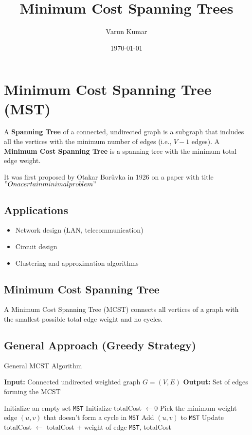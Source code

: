 \documentclass[a4paper,14pt]{extarticle}
\title{Minimum Cost Spanning Trees}
\author{Varun Kumar}
\date{\today}
\begin{document}
\maketitle
\tableofcontents
\lstlistoflistings
\listofalgorithms
\listoftables
\newpage
\section{Minimum Cost Spanning Tree (MST)}

A \textbf{Spanning Tree} of a connected, undirected graph is a subgraph that includes 
all the vertices with the minimum number of edges (i.e., $V-1$ edges). 
A \textbf{Minimum Cost Spanning Tree} is a spanning tree with the minimum total edge weight.

It was first proposed by Otakar Borůvka\cite{boruvka1926} in 1926 on a paper with title $"On a certain minimal problem"$


\subsection*{Applications}
\begin{itemize}
    \item Network design (LAN, telecommunication)\cite{gallager1983}
    \item Circuit design
    \item Clustering and approximation algorithms
\end{itemize}

\subsection{Minimum Cost Spanning Tree}

A Minimum Cost Spanning Tree (MCST) connects all vertices of a graph with the smallest possible total edge weight and no cycles.

\subsection{General Approach (Greedy Strategy)}

\begin{algorithm}[H]
\caption{General MCST Algorithm}
\begin{algorithmic}[1]
\State \textbf{Input:} Connected undirected weighted graph \(G = (V, E)\)
\State \textbf{Output:} Set of edges forming the MCST

    \State Initialize an empty set \texttt{MST}
    \State Initialize totalCost \( \gets 0 \)
        \State Pick the minimum weight edge \( (u, v) \) that doesn't form a cycle in \texttt{MST}
        \State Add \( (u, v) \) to \texttt{MST}
        \State Update totalCost \( \gets \) totalCost $+$ weight of edge
    \EndWhile
    \State \Return \texttt{MST}, totalCost
\EndFunction
\end{algorithmic}
\end{algorithm}
\end{document}
